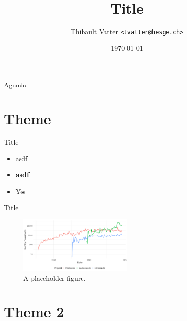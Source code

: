 \documentclass[11pt]{beamer}
\title{Title}
\institute{University of Applied Sciences Western Switzerland}
\date{\today}
\author[T.~Vatter]{Thibault Vatter \texttt{<tvatter@hesge.ch>}}
\begin{document}

{ %
\begin{frame}[noframenumbering] 
	\titlepage
\end{frame}
}


\begin{frame}{Agenda}
	\tableofcontents
\end{frame}


\section{Theme}


\begin{frame}{Title}

	\begin{itemize}
		\item asdf  
		\item  \textbf{asdf}  
		\item[\cmark] Yes
	\end{itemize}
\end{frame}

\begin{frame}{Title}

  \citep{vatter2015generalized}
  \begin{figure}[h]
    \centering
    \includegraphics[width=0.5\textwidth]{figures/popularity_vine_software.png}
    \caption{A placeholder figure.}
    \label{fig:placeholder}
  \end{figure}

\end{frame}


\section{Theme 2}
\end{document}
